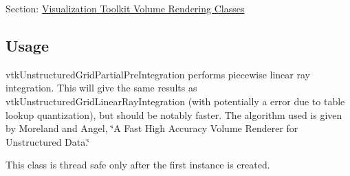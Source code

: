 Section\-: \hyperlink{sec_vtkvolumerendering}{Visualization Toolkit Volume Rendering Classes} \hypertarget{vtkwidgets_vtkxyplotwidget_Usage}{}\subsection{Usage}\label{vtkwidgets_vtkxyplotwidget_Usage}
vtk\-Unstructured\-Grid\-Partial\-Pre\-Integration performs piecewise linear ray integration. This will give the same results as vtk\-Unstructured\-Grid\-Linear\-Ray\-Integration (with potentially a error due to table lookup quantization), but should be notably faster. The algorithm used is given by Moreland and Angel, \char`\"{}\-A Fast High Accuracy Volume
 Renderer for Unstructured Data.\char`\"{}

This class is thread safe only after the first instance is created.

